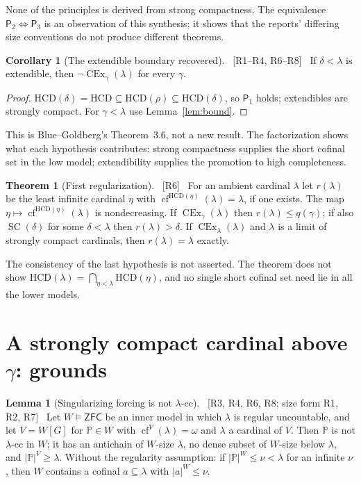 \documentclass[11pt,letterpaper]{article}
\theoremstyle{definition}
\newtheorem{theorem}[definition]{Theorem}
\newtheorem{lemma}[definition]{Lemma}
\newtheorem{corollary}[definition]{Corollary}
\numberwithin{equation}{section}
\newcommand{\ZFC}{\mathsf{ZFC}}
\newcommand{\HCD}{\mathrm{HCD}}
\newcommand{\SC}{\operatorname{SC}}
\newcommand{\CEx}{\operatorname{CEx}}
\newcommand{\cf}{\operatorname{cf}}
\newcommand{\PP}{\mathbb P}
\newcommand{\src}[1]{\unskip\ {\normalfont\small\sffamily\color{Olive}[#1]}\ }
\begin{document}
None of the principles is derived from strong compactness. The equivalence $\mathsf P_2\Leftrightarrow\mathsf P_3$ is an observation of this synthesis; it shows that the reports' differing size conventions do not produce different theorems.

\begin{corollary}[The extendible boundary recovered]\label{cor:ext}\src{R1--R4, R6--R8}
If $\delta<\lambda$ is extendible, then $\neg\CEx_\gamma(\lambda)$ for every $\gamma$.
\end{corollary}

\begin{proof}
$\HCD(\delta)=\HCD\subseteq\HCD(\rho)\subseteq\HCD(\delta)$, so $\mathsf P_1$ holds; extendibles are strongly compact. For $\gamma<\lambda$ use Lemma~\ref{lem:bound}.
\end{proof}

This is Blue--Goldberg's Theorem~3.6, not a new result. The factorization shows what each hypothesis contributes: strong compactness supplies the short cofinal set in the low model; extendibility supplies the promotion to high completeness.

\begin{theorem}[First regularization]\label{thm:first}\src{R6}
For an ambient cardinal $\lambda$ let $r(\lambda)$ be the least infinite cardinal $\eta$ with $\cf^{\HCD(\eta)}(\lambda)=\lambda$, if one exists. The map $\eta\mapsto\cf^{\HCD(\eta)}(\lambda)$ is nondecreasing. If $\CEx_\gamma(\lambda)$ then $r(\lambda)\le q(\gamma)$; if also $\SC(\delta)$ for some $\delta<\lambda$ then $r(\lambda)>\delta$. If $\CEx_\lambda(\lambda)$ and $\lambda$ is a limit of strongly compact cardinals, then $r(\lambda)=\lambda$ exactly.
\end{theorem}

The consistency of the last hypothesis is not asserted. The theorem does not show $\HCD(\lambda)=\bigcap_{\eta<\lambda}\HCD(\eta)$, and no single short cofinal set need lie in all the lower models.

\section{A strongly compact cardinal above \texorpdfstring{$\gamma$}{gamma}: grounds}\label{sec:above}

\begin{lemma}[Singularizing forcing is not $\lambda$-cc]\label{lem:cc}\src{R3, R4, R6, R8; size form R1, R2, R7}
Let $W\models\ZFC$ be an inner model in which $\lambda$ is regular uncountable, and let $V=W[G]$ for $\PP\in W$ with $\cf^V(\lambda)=\omega$ and $\lambda$ a cardinal of $V$. Then $\PP$ is not $\lambda$-cc in $W$; it has an antichain of $W$-size $\lambda$, no dense subset of $W$-size below $\lambda$, and $|\PP|^V\ge\lambda$. Without the regularity assumption: if $|\PP|^W\le\nu<\lambda$ for an infinite $\nu$, then $W$ contains a cofinal $a\subseteq\lambda$ with $|a|^W\le\nu$.
\end{lemma}
\end{document}
